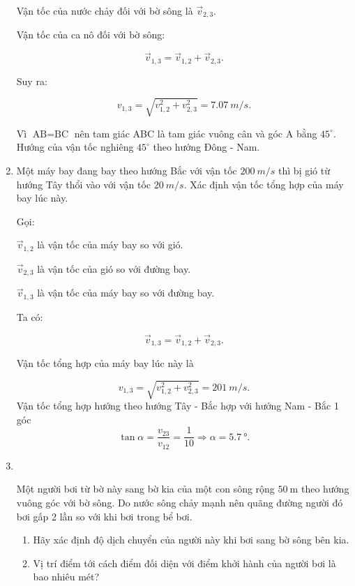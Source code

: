 \begin{enumerate}[label=\bfseries Bài \arabic*:,leftmargin=1.5cm]
{		Vận tốc của nước chảy đối với bờ sông là $\vec v_{2,3}$. 
		
		Vận tốc của ca nô đối với bờ sông:
		
		$$\vec v_{1,3} = \vec v_{1,2} + \vec v_{2,3}.$$
		
		Suy ra:
		
		$$v_{1,3} = \sqrt{ v_{1,2}^2 + v_{2,3}^2} = \SI{7,07}{m/s}.$$
		
		Vì $\text{AB} = \text{BC}$ nên tam giác ABC là tam giác vuông cân và góc A bằng $45^\circ$. Hướng của vận tốc nghiêng $45^\circ$ theo hướng Đông - Nam.
	}
	\item {}
	
	
	{
		Một máy bay đang bay theo hướng Bắc với vận tốc $\SI{200}{m/s}$ thì bị gió từ hướng Tây thổi vào với vận tốc $\SI{20}{m/s}$. Xác định vận tốc tổng hợp của máy bay lúc này.
	}
	\hideall
	{
		Gọi:
		
		$\vec v_{1,2}$ là vận tốc của máy bay so với gió.
		
		$\vec v_{2,3}$ là vận tốc của gió so với đường bay.
		
		$\vec v_{1,3}$ là vận tốc của máy bay so với đường bay.
		
		Ta có:
		
		$$\vec v_{1,3} = \vec v_{1,2} + \vec v_{2,3}.$$
		
		Vận tốc tổng hợp của máy bay lúc này là
		
		$$v_{1,3} = \sqrt{v_{1,2}^2 + v^2_{2,3}} = \SI{201}{m/s}.$$
		Vận tốc tổng hợp hướng theo hướng Tây - Bắc hợp với hướng Nam - Bắc 1 góc 
		$$\tan\alpha=\dfrac{v_{23}}{v_{12}}=\dfrac{1}{10}\Rightarrow \alpha =\SI{5.7}{\degree}.$$
	}
		

\item {}\\
{Một người bơi từ bờ này sang bờ kia của một con sông rộng $\SI{50}{\meter}$ theo hướng vuông góc với bờ sông. Do nước sông chảy mạnh nên quãng đường người đó bơi gấp 2 lần so với khi bơi trong bể bơi.
	\begin{enumerate}[label=\alph*)]
		\item Hãy xác định độ dịch chuyển của người này khi bơi sang bờ sông bên kia.
		\item Vị trí điểm tới cách điểm đối diện với điểm khởi hành của người bơi là bao nhiêu mét?
	\end{enumerate}
	
}
\end{enumerate}
